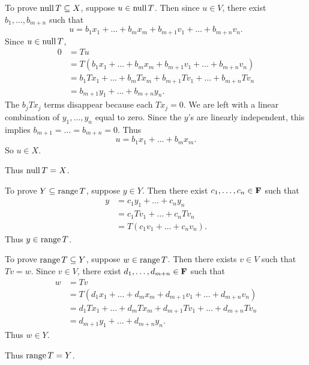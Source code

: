 \documentclass[a5paper]{article}
\begin{document}
    To prove $\operatorname{null}T \subseteq X$, suppose $u \in \operatorname{null}T$.
    Then since $u \in V$, there exist $b_1,\dots,b_{m+n}$ such that
\begin{equation*}
        u = b_1x_1 + \dots + b_mx_m + b_{m+1}v_1 + \dots + b_{m+n}v_n .
\end{equation*}
    Since $u \in \operatorname{null}T$,
\begin{align*}
        0 &= Tu \\
          &= T(b_1x_1 + \dots + b_mx_m + b_{m+1}v_1 + \dots + b_{m+n}v_n) \\
          &= b_1Tx_1 + \dots + b_mTx_m + b_{m+1}Tv_1 + \dots + b_{m+n}Tv_n \\
          &= b_{m+1}y_1 + \dots + b_{m+n}y_n .
\end{align*}
    The $b_jTx_j$ terms disappear because each $Tx_j = 0$.
    We are left with a linear combination of $y_1,\dots,y_n$ equal to zero.
    Since the $y$'s are linearly independent, this implies $b_{m+1}=\dots=b_{m+n}=0$.
    Thus
\begin{equation*}
        u = b_1x_1 + \dots + b_mx_m .
\end{equation*}
    So $u \in X$.

    Thus $\operatorname{null}T = X$.

    To prove $Y \subseteq \operatorname{range}T$, suppose $y \in Y$.
    Then there exist $c_1,\dots,c_n \in \mathbf{F}$ such that
\begin{align*}
        y &= c_1y_1 + \dots + c_ny_n \\
          &= c_1Tv_1 + \dots + c_nTv_n \\
          &= T(c_1v_1 + \dots + c_nv_n) .
\end{align*}
    Thus $y \in \operatorname{range}T$.

    To prove $\operatorname{range}T \subseteq Y$, suppose $w \in \operatorname{range}T$.
    Then there exists $v \in V$ such that $Tv = w$.
    Since $v \in V$, there exist $d_1,\dots,d_{m+n} \in \mathbf{F}$ such that
\begin{align*}
        w &= Tv \\
          &= T(d_1x_1 + \dots + d_mx_m + d_{m+1}v_1 + \dots + d_{m+n}v_n) \\
          &= d_1Tx_1 + \dots + d_mTx_m + d_{m+1}Tv_1 + \dots + d_{m+n}Tv_n \\
          &= d_{m+1}y_1 + \dots + d_{m+n}y_n .
\end{align*}
    Thus $w \in Y$.

    Thus $\operatorname{range}T = Y$.
\end{document}
